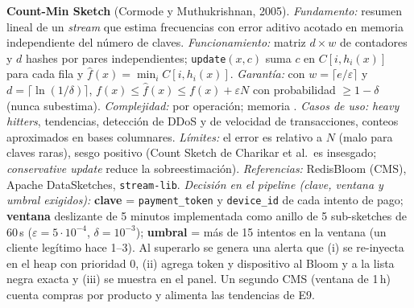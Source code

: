 \textbf{Count-Min Sketch} (Cormode y Muthukrishnan, 2005). \emph{Fundamento:} resumen lineal de un \emph{stream} que estima frecuencias con error
aditivo acotado en memoria independiente del número de claves. \emph{Funcionamiento:} matriz $d\times w$ de contadores y $d$ hashes por pares
independientes; \texttt{update}$(x,c)$ suma $c$ en $C[i,h_i(x)]$ para cada fila y $\hat f(x)=\min_i C[i,h_i(x)]$. \emph{Garantía:} con
$w=\lceil e/\varepsilon\rceil$ y $d=\lceil\ln(1/\delta)\rceil$, $f(x)\le\hat f(x)\le f(x)+\varepsilon N$ con probabilidad $\ge1-\delta$ (nunca subestima).
\emph{Complejidad:}  por operación; memoria . \emph{Casos de uso:} \emph{heavy hitters}, tendencias, detección de DDoS y de
velocidad de transacciones, conteos aproximados en bases columnares. \emph{Límites:} el error es relativo a $N$ (malo para claves raras),
sesgo positivo (Count Sketch de Charikar et al.\ es insesgado; \emph{conservative update} reduce la sobreestimación). \emph{Referencias:}
RedisBloom (CMS), Apache DataSketches, \texttt{stream-lib}.
\emph{Decisión en el pipeline (clave, ventana y umbral exigidos):} \textbf{clave} = \texttt{payment\_token} y \texttt{device\_id} de cada intento de
pago; \textbf{ventana} deslizante de 5 minutos implementada como anillo de 5 sub-sketches de 60\,s ($\varepsilon=5\cdot10^{-4}$, $\delta=10^{-3}$);
\textbf{umbral} = más de 15 intentos en la ventana (un cliente legítimo hace 1–3). Al superarlo se genera una alerta que (i) se re-inyecta en el heap
con prioridad 0, (ii) agrega token y dispositivo al Bloom y a la lista negra exacta y (iii) se muestra en el panel. Un segundo CMS (ventana de 1\,h)
cuenta compras por producto y alimenta las tendencias de E9.

